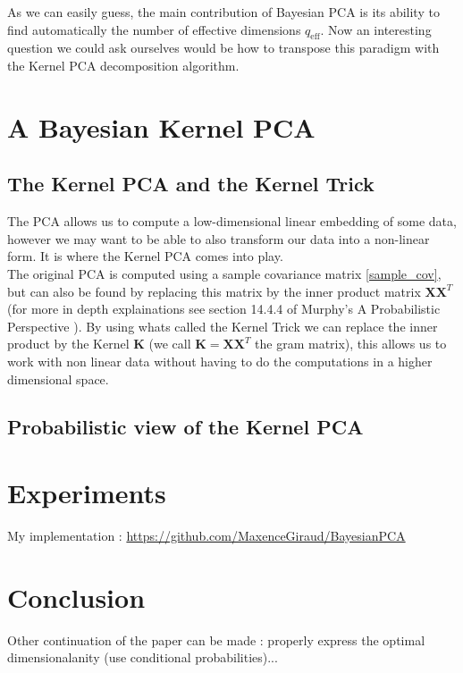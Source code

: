 \documentclass{article}
\begin{document}
As we can easily guess, the main contribution of Bayesian PCA is its ability to find automatically the number of effective dimensions $q_{\text{eff}}$. Now an interesting question we could ask ourselves would be how to transpose this paradigm with the Kernel PCA decomposition algorithm.

\section{A Bayesian Kernel PCA}

\subsection{The Kernel PCA and the Kernel Trick}

The PCA allows us to compute a low-dimensional linear embedding of some data, however we may want to be able to also transform our data into a non-linear form. It is where the Kernel PCA comes into play.\\
The original PCA is computed using a sample covariance matrix \ref{sample_cov}, but can also be found by replacing this matrix by the inner product matrix $\mathbf{X} \mathbf{X}^T$ (for more in depth explainations see section 14.4.4 of Murphy's A Probabilistic Perspective \cite{KevinP.Murphy17}). By using whats called the Kernel Trick we can replace the inner product by the Kernel $\mathbf{K}$ (we call $\mathbf{K} = \mathbf{X}\mathbf{X}^T$ the gram matrix), this allows us to work with non linear data without having to do the computations in a higher dimensional space.

\subsection{Probabilistic view of the Kernel PCA}

\cite{pkpca}

\section{Experiments}
My implementation : \url{https://github.com/MaxenceGiraud/BayesianPCA} 

\section{Conclusion}

Other continuation of the paper can be made : properly express the optimal dimensionalanity (use conditional probabilities)...


\end{document}
